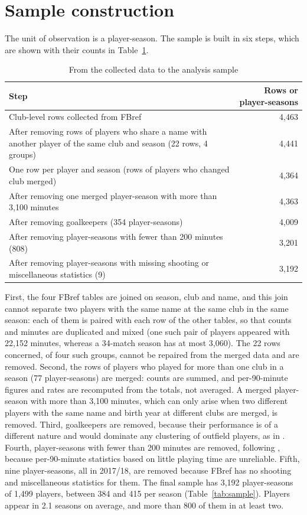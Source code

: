 \section{Sample construction}
\label{sec:data-sample}

The unit of observation is a player-season. The sample is built in six steps, which are shown with their counts in Table~\ref{tab:sample-steps}.

\begin{table}[ht]
	\centering
	\small
	\caption{From the collected data to the analysis sample}
	\label{tab:sample-steps}
	\begin{tabular}{p{11.2cm}r}
		\toprule
		Step & Rows or player-seasons \\
		\midrule
		Club-level rows collected from FBref & 4,463 \\
		After removing rows of players who share a name with another player of the same club and season (22 rows, 4 groups) & 4,441 \\
		One row per player and season (rows of players who changed club merged) & 4,364 \\
		After removing one merged player-season with more than 3,100 minutes & 4,363 \\
		After removing goalkeepers (354 player-seasons) & 4,009 \\
		After removing player-seasons with fewer than 200 minutes (808) & 3,201 \\
		After removing player-seasons with missing shooting or miscellaneous statistics (9) & 3,192 \\
		\bottomrule
	\end{tabular}
\end{table}

First, the four FBref tables are joined on season, club and name, and this join cannot separate two players with the same name at the same club in the same season: each of them is paired with each row of the other tables, so that counts and minutes are duplicated and mixed (one such pair of players appeared with 22,152 minutes, whereas a 34-match season has at most 3,060). The 22 rows concerned, of four such groups, cannot be repaired from the merged data and are removed. Second, the rows of players who played for more than one club in a season (77 player-seasons) are merged: counts are summed, and per-90-minute figures and rates are recomputed from the totals, not averaged. A merged player-season with more than 3,100 minutes, which can only arise when two different players with the same name and birth year at different clubs are merged, is removed. Third, goalkeepers are removed, because their performance is of a different nature and would dominate any clustering of outfield players, as in . Fourth, player-seasons with fewer than 200 minutes are removed, following , because per-90-minute statistics based on little playing time are unreliable. Fifth, nine player-seasons, all in 2017/18, are removed because FBref has no shooting and miscellaneous statistics for them. The final sample has 3,192 player-seasons of 1,499 players, between 384 and 415 per season (Table~\ref{tab:sample}). Players appear in 2.1 seasons on average, and more than 800 of them in at least two.

